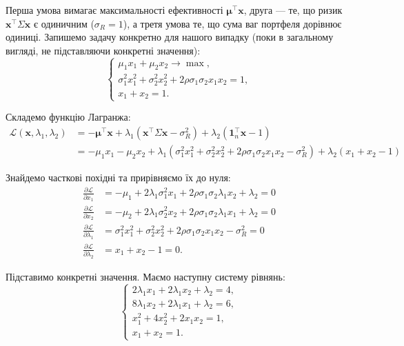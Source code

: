 \documentclass{test_template}
\begin{document}
Перша умова вимагає максимальності ефективності
$\boldsymbol{\mu}^{\top}\mathbf{x}$, друга --- те, що ризик
$\mathbf{x}^{\top}\Sigma\mathbf{x}$ є одиничним ($\sigma_R=1$), а 
третя умова те, що сума ваг портфеля дорівнює одиниці. Запишемо 
задачу конкретно для нашого випадку (поки в загальному вигляді, не 
підставляючи конкретні значення):
\begin{equation*}
    \begin{cases}
        \mu_1x_1 + \mu_2x_2 \to \max, \\
        \sigma_1^2x_1^2 + \sigma_2^2x_2^2 + 2\rho\sigma_1\sigma_2x_1x_2 = 1, \\
        x_1 + x_2 = 1.
    \end{cases}
\end{equation*}

Складемо функцію Лагранжа:
\begin{align*}
    \mathcal{L}(\mathbf{x},\lambda_1,\lambda_2) &= -\boldsymbol{\mu}^{\top}\mathbf{x} + \lambda_1(\mathbf{x}^{\top}\Sigma\mathbf{x} - \sigma_R^2) + \lambda_2(\mathbf{1}_n^{\top}\mathbf{x} - 1)\\
    &= -\mu_1x_1 - \mu_2x_2 + \lambda_1(\sigma_1^2x_1^2 + \sigma_2^2x_2^2 + 2\rho\sigma_1\sigma_2x_1x_2 - \sigma_R^2) + \lambda_2(x_1 + x_2 - 1)
\end{align*}

Знайдемо часткові похідні та прирівняємо їх до нуля:
\begin{align*}
    \frac{\partial \mathcal{L}}{\partial x_1} &= -\mu_1 + 2\lambda_1 \sigma_1^2 x_1 + 2\rho\sigma_1\sigma_2\lambda_1 x_2 + \lambda_2 = 0 \\
    \frac{\partial \mathcal{L}}{\partial x_2} &= -\mu_2 + 2\lambda_1 \sigma_2^2 x_2 + 2\rho\sigma_1\sigma_2\lambda_1 x_1 + \lambda_2 = 0 \\
    \frac{\partial \mathcal{L}}{\partial \lambda_1} &= \sigma_1^2x_1^2 + \sigma_2^2x_2^2 + 2\rho\sigma_1\sigma_2x_1x_2 - \sigma_R^2 = 0 \\
    \frac{\partial \mathcal{L}}{\partial \lambda_2} &= x_1 + x_2 - 1 = 0.
\end{align*}

Підставимо конкретні значення. Маємо наступну систему рівнянь:
\begin{equation*}
    \begin{cases}
        2\lambda_1 x_1 + 2\lambda_1 x_2 + \lambda_2 = 4, \\
        8\lambda_1 x_2 + 2\lambda_1 x_1 + \lambda_2 = 6, \\
        x_1^2 + 4x_2^2 + 2x_1x_2 = 1, \\
        x_1 + x_2 = 1.
    \end{cases}
\end{equation*}
\end{document}
